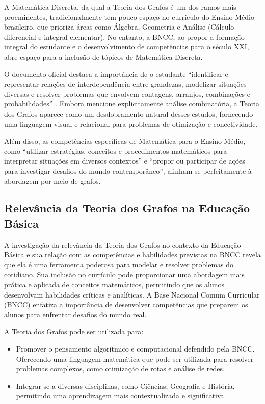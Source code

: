\documentclass[
  12pt,
  oneside,
  a4paper,
  english,
  brazilian
  ]{abntex2}
\theoremstyle{definition}
\begin{document}
A Matemática Discreta, da qual a Teoria dos Grafos é um dos ramos mais
proeminentes, tradicionalmente tem pouco espaço no currículo do Ensino Médio
brasileiro, que prioriza áreas como Álgebra, Geometria e Análise (Cálculo
diferencial e integral elementar). No entanto, a BNCC, ao propor a formação
integral do estudante e o desenvolvimento de competências para o século XXI,
abre espaço para a inclusão de tópicos de Matemática Discreta.

O documento oficial destaca a importância de o estudante ``identificar e
representar relações de interdependência entre grandezas, modelizar situações
diversas e resolver problemas que envolvem contagens, arranjos, combinações e
probabilidades'' \cite{brasil2018}. Embora mencione explicitamente análise
combinatória, a Teoria dos Grafos aparece como um desdobramento natural desses
estudos, fornecendo uma linguagem visual e relacional para problemas de
otimização e conectividade.

Além disso, as competências específicas de Matemática para o Ensino Médio, como
``utilizar estratégias, conceitos e procedimentos matemáticos para interpretar
situações em diversos contextos'' e ``propor ou participar de ações para
investigar desafios do mundo contemporâneo'', alinham-se perfeitamente à
abordagem por meio de grafos.

\subsection{Relevância da Teoria dos Grafos na Educação Básica}

A investigação da relevância da Teoria dos Grafos no contexto da Educação Básica e sua relação com as competências e habilidades previstas na BNCC revela que ela é uma ferramenta poderosa para modelar e resolver problemas do cotidiano. Sua inclusão no currículo pode proporcionar uma abordagem mais prática e aplicada de conceitos matemáticos, permitindo que os alunos desenvolvam habilidades críticas e analíticas. A Base Nacional Comum Curricular (BNCC) \cite{brasil2018} enfatiza a importância de desenvolver competências que preparem os alunos para enfrentar desafios do mundo real.

A Teoria dos Grafos pode ser utilizada para:

\begin{itemize}
    \item Promover o pensamento algorítmico e computacional defendido pela BNCC. Oferecendo uma linguagem matemática que pode ser utilizada para resolver problemas complexos, como otimização de rotas e análise de redes.
    \item Integrar-se a diversas disciplinas, como Ciências, Geografia e História, permitindo uma aprendizagem mais contextualizada e significativa.
\end{itemize}
\end{document}
